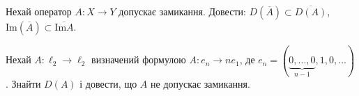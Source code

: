 \begin{exercise}
    Нехай оператор $A: X \rightarrow Y$ допускає замикання. Довести:
    $D(\overline{A}) \subset \overline{D(A)}$, $\mathrm{Im}(\overline{A}) \subset 
    \overline{\mathrm{Im}A}$.
\end{exercise}

\begin{exercise}
    Нехай $A: \ell_2 \rightarrow \ell_2$ визначений формулою $A: e_n 
    \rightarrow ne_1$, де $e_n = (\underbrace{0, ..., 0}_{n-1}, 1, 0, ...)$. 
    Знайти $D(A)$ і довести, що $A$ не допускає замикання.
\end{exercise}